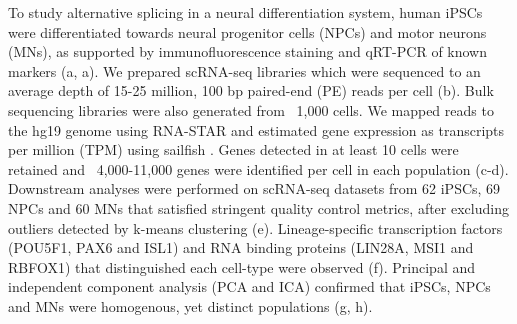 To study alternative splicing in a neural differentiation system, human iPSCs were differentiated towards neural progenitor cells (NPCs) and motor neurons (MNs), as supported by immunofluorescence staining and qRT-PCR of known markers (a, a). We prepared scRNA-seq libraries \cite{Ramskold2012} which were sequenced to an average depth of 15-25 million, 100 bp paired-end (PE) reads per cell (b). Bulk sequencing libraries were also generated from ~1,000 cells. We mapped reads to the hg19 genome using RNA-STAR \cite{Dobin:2013fg} and estimated gene expression as transcripts per million (TPM) using sailfish \cite{Patro:2014jd}. Genes detected in at least 10 cells were retained and ~4,000-11,000 genes were identified per cell in each population (c-d). Downstream analyses were performed on scRNA-seq datasets from 62 iPSCs, 69 NPCs and 60 MNs that satisfied stringent quality control metrics, after excluding outliers detected by k-means clustering (e). Lineage-specific transcription factors (POU5F1, PAX6 and ISL1) and RNA binding proteins (LIN28A, MSI1 and RBFOX1) that distinguished each cell-type were observed (f). Principal and independent component analysis (PCA and ICA) confirmed that iPSCs, NPCs and MNs were homogenous, yet distinct populations (g, h).

